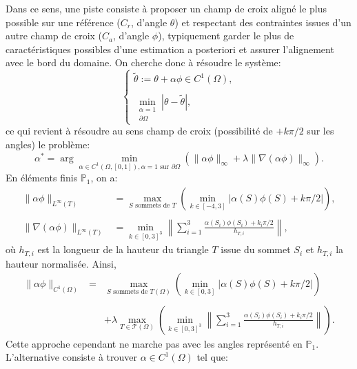 Dans ce sens, une piste consiste à proposer un champ de croix aligné le plus possible sur une référence ($C_r$, d'angle $\theta$) et respectant des contraintes issues d'un autre champ de croix ($C_a$, d'angle $\phi$), typiquement garder le plus de caractéristiques possibles d'une estimation a posteriori et assurer l'alignement avec le bord du domaine. On cherche donc à résoudre le système:
\begin{equation}
\begin{cases}
    \tilde{\theta} := \theta + \alpha\phi \in C^1(\Omega), \\\\
    \min_{\substack{\alpha=1 \\ \partial\Omega}} \left\lvert \theta - \tilde{\theta} \right\rvert,
\end{cases}
\end{equation}
ce qui revient à résoudre au sens champ de croix (possibilité de $+k\pi/2$ sur les angles) le problème:
$$
\alpha^* = \arg\min_{\alpha\in C^1(\Omega,[0,1]), \alpha=1 \text{ sur } \partial\Omega} \left( \lVert \alpha\phi \rVert_\infty + \lambda \lVert \nabla (\alpha\phi) \rVert_\infty \right).
$$
En éléments finis $\mathbb{P}_1$, on a:
\begin{equation}
\begin{aligned}
    \lVert \alpha\phi \rVert_{L^\infty(T)} &= \max_{S \text{ sommets de } T} \left( \min_{k\in[-4,3]} \left\lvert \alpha(S)\phi(S) + k\pi/2 \right\rvert \right), \\\\
    \lVert \nabla (\alpha\phi) \rVert_{L^\infty(T)} &= \min_{k\in[0,3]^3} \left\lVert \sum_{i=1}^{3} \frac{\alpha(S_i)\phi(S_i) + k_i\pi/2}{h_{T,i}} \right\rVert,
\end{aligned}
\end{equation}
où $h_{T,i}$ est la longueur de la hauteur du triangle $T$ issue du sommet $S_i$ et $h_{T,i}$ la hauteur normalisée. Ainsi,
\[
\begin{array}{lcl}
\lVert \alpha\phi \rVert_{C^1(\Omega)} &=& \max_{S \text{ sommets de } T (\Omega)} \left( \min_{k\in[0,3]} \left\lvert \alpha(S)\phi(S) + k\pi/2 \right\rvert \right)\\\\
&&+ \lambda \max_{T\in\mathcal{T}(\Omega)} \left( \min_{k\in[0,3]^3} \left\lVert \sum_{i=1}^{3} \frac{\alpha(S_i)\phi(S_i) + k_i\pi/2}{h_{T,i}} \right\rVert \right).
\end{array}
\]
Cette approche cependant ne marche pas avec les angles représenté en $\mathbb{P}_1$. L'alternative consiste à trouver $\alpha \in C^1(\Omega)$ tel que:
